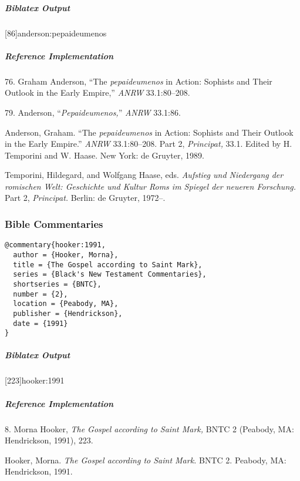 \documentclass[a4paper]{article}
\newenvironment{biboutput}{%
  \subparagraph{Biblatex Output}
}{\color{black}}
\newenvironment{refimp}{%
  \subparagraph{Reference Implementation}
  \color{reference-colour}
  \rm
}{\par\color{black}}
\begin{document}
\begin{biboutput}
  [86]{anderson:pepaideumenos}
\end{biboutput}

\begin{refimp}
  76. Graham Anderson, “The \emph{pepaideumenos} in Action: Sophists and Their
  Outlook in the Early Empire,” \emph{ANRW} 33.1:80–208.

  79. Anderson, “\emph{Pepaideumenos,}” \emph{ANRW} 33.1:86.

  \hangindent\bibindent Anderson, Graham. “The \emph{pepaideumenos} in Action:
  Sophists and Their Outlook in the Early Empire.” \emph{ANRW} 33.1:80–208.
  Part 2, \emph{Principat,} 33.1. Edited by H. Temporini and W. Haase. New
  York: de Gruyter, 1989.

  \hangindent\bibindent Temporini, Hildegard, and Wolfgang Haase, eds.
  \emph{Aufstieg und Niedergang der romischen Welt: Geschichte und Kultur Roms
  im Spiegel der neueren Forschung.} Part 2, \emph{Principat.} Berlin: de
  Gruyter, 1972–.

\end{refimp}

\subsubsection{Bible Commentaries}

\begin{lstlisting}
@commentary{hooker:1991,
  author = {Hooker, Morna},
  title = {The Gospel according to Saint Mark},
  series = {Black's New Testament Commentaries},
  shortseries = {BNTC},
  number = {2},
  location = {Peabody, MA},
  publisher = {Hendrickson},
  date = {1991}
}
\end{lstlisting}  

\begin{biboutput}
  [223]{hooker:1991}
\end{biboutput}

\begin{refimp}
  8. Morna Hooker, \emph{The Gospel according to Saint Mark,} BNTC 2 (Peabody,
  MA: Hendrickson, 1991), 223.

  \hangindent\bibindent Hooker, Morna. \emph{The Gospel according to Saint
  Mark.} BNTC 2. Peabody, MA: Hendrickson, 1991.

\end{refimp}
\end{document}
